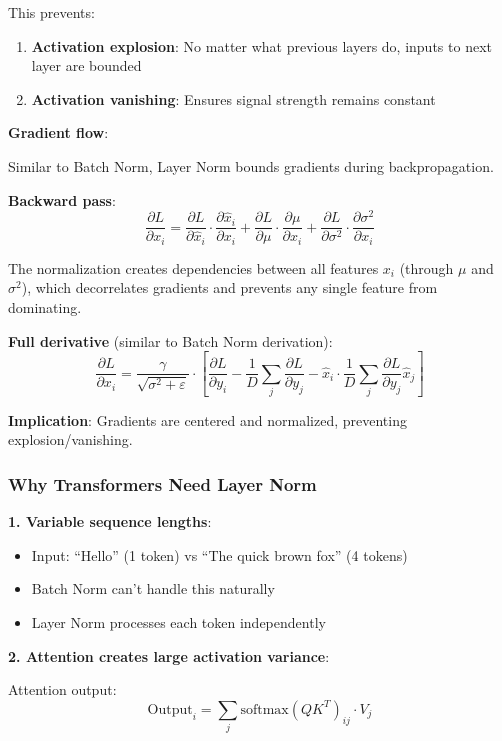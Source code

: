 This prevents:
\begin{enumerate}
\item \textbf{Activation explosion}: No matter what previous layers do, inputs to next layer are bounded
\item \textbf{Activation vanishing}: Ensures signal strength remains constant
\end{enumerate}

\textbf{Gradient flow}:

Similar to Batch Norm, Layer Norm bounds gradients during backpropagation.

\textbf{Backward pass}:
\[
\frac{\partial L}{\partial x_i} = \frac{\partial L}{\partial \hat{x}_i} \cdot \frac{\partial \hat{x}_i}{\partial x_i} + \frac{\partial L}{\partial \mu} \cdot \frac{\partial \mu}{\partial x_i} + \frac{\partial L}{\partial \sigma^2} \cdot \frac{\partial \sigma^2}{\partial x_i}
\]

The normalization creates dependencies between all features $x_i$ (through $\mu$ and $\sigma^2$), which decorrelates gradients and prevents any single feature from dominating.

\textbf{Full derivative} (similar to Batch Norm derivation):
\[
\frac{\partial L}{\partial x_i} = \frac{\gamma}{\sqrt{\sigma^2 + \varepsilon}} \cdot \left[\frac{\partial L}{\partial y_i} - \frac{1}{D}\sum_j\frac{\partial L}{\partial y_j} - \hat{x}_i \cdot \frac{1}{D}\sum_j\frac{\partial L}{\partial y_j}\hat{x}_j\right]
\]

\textbf{Implication}: Gradients are centered and normalized, preventing explosion/vanishing.

\subsubsection{Why Transformers Need Layer Norm}

\textbf{1. Variable sequence lengths}:
\begin{itemize}
\item Input: ``Hello'' (1 token) vs ``The quick brown fox'' (4 tokens)
\item Batch Norm can't handle this naturally
\item Layer Norm processes each token independently
\end{itemize}

\textbf{2. Attention creates large activation variance}:

Attention output:
\[
\text{Output}_i = \sum_j \text{softmax}(QK^T)_{ij} \cdot V_j
\]

